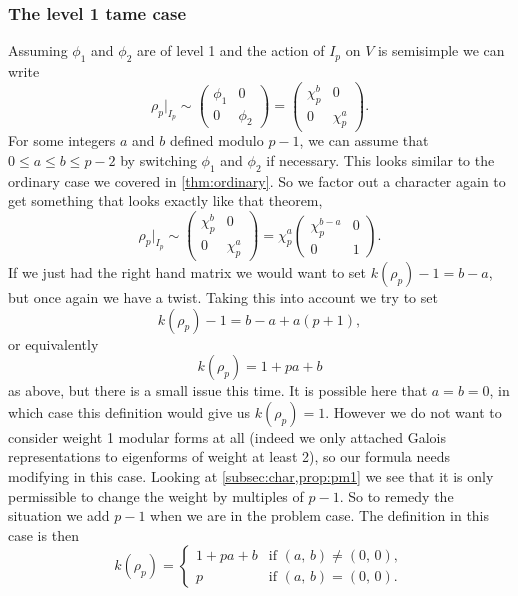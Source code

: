 \documentclass[a4paper,12pt]{article}
\begin{document}
\subsubsection{The level 1 tame case}\label{sec:l1t}
Assuming $\phi_1$ and $\phi_2$ are of level 1 and the action of $I_p$ on $V$ is semisimple we can write
\[
\rho_p |_{I_p} \sim \begin{pmatrix}
\phi_1 & 0 \\
0      & \phi_2 \end{pmatrix} = \begin{pmatrix}
\chi_p^b & 0 \\
0      & \chi_p^a \end{pmatrix}.
\]
For some integers $a$ and $b$ defined modulo $p-1$, we can assume that $0\le a \le b \le p-2$ by switching $\phi_1$ and $\phi_2$ if necessary.
This looks similar to the ordinary case we covered in \cref{thm:ordinary}.
So we factor out a character again to get something that looks exactly like that theorem,
\[
\rho_p|_{I_p} \sim
\begin{pmatrix}
\chi_p^b & 0 \\
0        & \chi_p^a \end{pmatrix}=
\chi_p^a\begin{pmatrix}
\chi_p^{b-a} & 0 \\
0            & 1 \end{pmatrix}.
\]
If we just had the right hand matrix we would want to set $k(\rho_p) - 1 = b-a$, but once again we have a twist.
Taking this into account we try to set
\[
k(\rho_p) - 1 = b - a + a(p+1),
\]
or equivalently
\[
k(\rho_p) = 1 + pa + b
\]
as above, but there is a small issue this time.
It is possible here that $a = b = 0$, in which case this definition would give us $k(\rho_p) = 1$.
However we do not want to consider weight 1 modular forms at all (indeed we only attached Galois representations to eigenforms of weight at least 2), so our formula needs modifying in this case.
Looking at \cref{subsec:char,prop:pm1} we see that it is only permissible to change the weight by multiples of $p-1$.
So to remedy the situation we add $p-1$ when we are in the problem case.
The definition in this case is then
\begin{equation}\label{eq:l1t}
k(\rho_p) = \begin{cases}
1 + pa + b & \text{if }(a,\,b) \ne (0,\,0), \\
         p & \text{if }(a,\,b) = (0,\,0).
\end{cases}
\end{equation}
\end{document}
